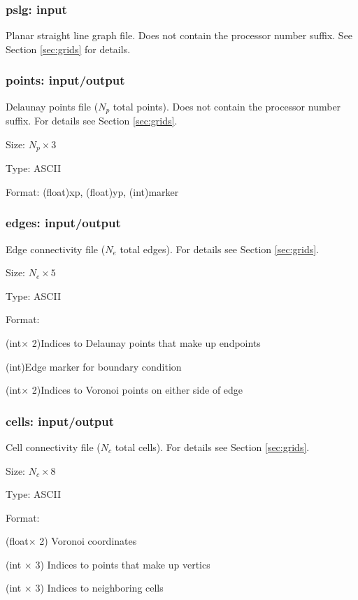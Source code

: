 \subsubsection{pslg: input}

Planar straight line graph file. Does not contain the processor number suffix.
 See Section \ref{sec:grids} for details.

\subsubsection{points: input/output}

Delaunay points file ($N_p$ total points).  Does not contain
the processor number suffix. For details see Section \ref{sec:grids}.
\begin{list}{}
\item Size: $N_p\times 3$
\item Type: ASCII
\item Format: (float)xp, (float)yp, (int)marker
\end{list}

\subsubsection{edges: input/output}

Edge connectivity file ($N_e$ total edges). For details see Section \ref{sec:grids}.
\begin{list}{}
\item Size: $N_e\times 5$
\item Type: ASCII
\item Format: 
\begin{list}{}
\item (int$\times$ 2)Indices to Delaunay points that make up endpoints
\item (int)Edge marker for boundary condition
\item (int$\times$ 2)Indices to Voronoi points on either side of edge
\end{list}
\end{list}


\subsubsection{cells: input/output}

Cell connectivity file ($N_c$ total cells). For details see Section \ref{sec:grids}.
\begin{list}{}
\item Size: $N_c\times 8$
\item Type: ASCII
\item Format: 
\begin{list}{}
\item (float$\times$ 2) Voronoi coordinates
\item (int $\times$ 3) Indices to points that make up vertics
\item (int $\times$ 3) Indices to neighboring cells 
\end{list}
\end{list}

